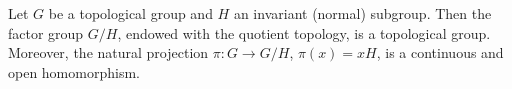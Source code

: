 Let $G$ be a topological group and $H$ an invariant (normal) subgroup. Then the factor group $G/H$, endowed with the quotient topology, is a topological group. Moreover, the natural projection $\pi: G \to G/H$, $\pi(x) = xH$, is a continuous and open homomorphism.
